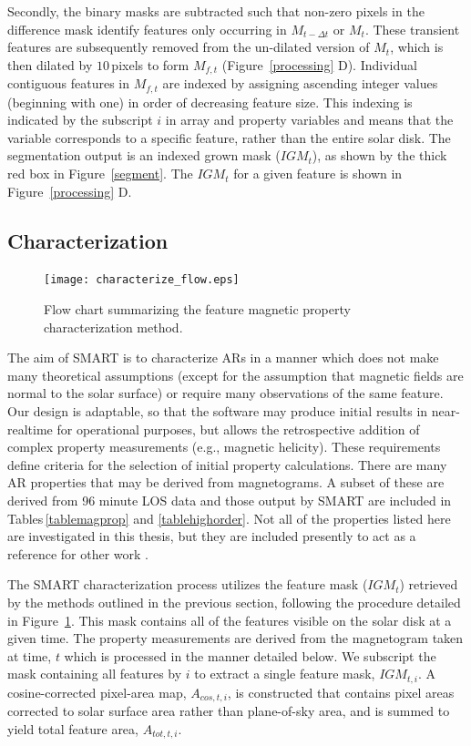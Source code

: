 Secondly, the binary masks are subtracted such that non-zero pixels in the difference mask identify features only occurring in $M_{t-\Delta t}$ or $M_{t}$. These transient features are subsequently removed from the un-dilated version of $M_{t}$, which is then dilated by $10$\,pixels to form $M_{f,t}$ (Figure~\ref{processing} D). Individual contiguous features in $M_{f,t}$ are indexed by assigning ascending integer values (beginning with one) in order of decreasing feature size. This indexing is indicated by the subscript $i$ in array and property variables and means that the variable corresponds to a specific feature, rather than the entire solar disk.  The segmentation output is an indexed grown mask ($IGM_{t}$), as shown by the thick red box in Figure~\ref{segment}. The $IGM_{t}$ for a given feature is shown in Figure~\ref{processing} D.


\subsection{Characterization}\label{magprop}

\begin{figure}[!t]
\centerline{\texttt{[image: characterize\_flow.eps]}}
\caption[The SMART characterisation method.]{Flow chart summarizing the feature magnetic property characterization method.}
\label{flow_char}
\end{figure}

The aim of \gls{SMART} is to characterize \glspl{AR} in a manner which does not make many theoretical assumptions (except for the assumption that magnetic fields are normal to the solar surface) or require many observations of the same feature.  Our design is adaptable, so that the software may produce initial results in near-realtime for operational purposes, but allows the retrospective addition of complex property measurements (e.g., magnetic helicity). These requirements define criteria for the selection of initial property calculations. There are many \gls{AR} properties that may be derived from magnetograms. A subset of these are derived from 96 minute \gls{LOS} data and those output by \gls{SMART} are included in Tables\,\ref{tablemagprop} and \ref{tablehighorder}. Not all of the properties listed here are investigated in this thesis, but they are included presently to act as a reference for other work \citep[e.g.][]{Ahmed:2011}.

The \gls{SMART} characterization process utilizes the feature mask ($IGM_{t}$) retrieved by the methods outlined in the previous section, following the procedure detailed in Figure~\ref{flow_char}. This mask contains all of the features visible on the solar disk at a given time. The property measurements are derived from the magnetogram taken at time, $t$ which is processed in the manner detailed below. We subscript the mask containing all features by $i$ to extract a single feature mask, $IGM_{t,i}$. A cosine-corrected pixel-area map, $A_{cos,t,i}$,  is constructed that contains pixel areas corrected to solar surface area rather than plane-of-sky area, and is summed to yield total feature area, $A_{tot,t,i}$. 


